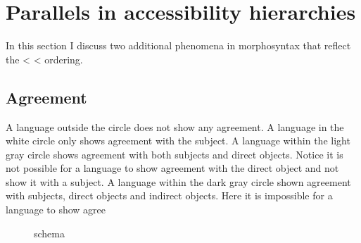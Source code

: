 \section{Parallels in accessibility hierarchies}

In this section I discuss two additional phenomena in morphosyntax that reflect the  <  <  ordering.

\subsection{Agreement}

%

A language outside the circle does not show any agreement. A language in the white circle only shows agreement with the subject. A language within the light gray circle shows agreement with both subjects and direct objects. Notice it is not possible for a language to show agreement with the direct object and not show it with a subject. A language within the dark gray circle shown agreement with subjects, direct objects and indirect objects. Here it is impossible for a language to show agree

\begin{figure}[H]
  \centering
  \caption{ schema}
  \label{fig:subdoio}
\end{figure}


